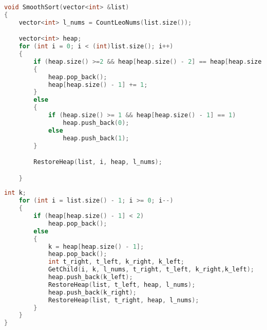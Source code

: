         \begin{lstlisting}[language=C++, label=lst:sort:Smooth_1, caption=Алгоритм плавной сортировки]
void SmoothSort(vector<int> &list)
{
    vector<int> l_nums = CountLeoNums(list.size());

    vector<int> heap;
    for (int i = 0; i < (int)list.size(); i++)
    {
        if (heap.size() >=2 && heap[heap.size() - 2] == heap[heap.size() - 1] + 1)
        {
            heap.pop_back();
            heap[heap.size() - 1] += 1; 
        }
        else
        {
            if (heap.size() >= 1 && heap[heap.size() - 1] == 1)
                heap.push_back(0);
            else
                heap.push_back(1);
        }

        RestoreHeap(list, i, heap, l_nums);

    }
        \end{lstlisting}
        \par \text{      }
        \begin{lstlisting}[language=C++, label=lst:sort:Smooth_2, caption=Алгоритм плавной сортировки]
    int k;
    for (int i = list.size() - 1; i >= 0; i--)
    {
        if (heap[heap.size() - 1] < 2)
            heap.pop_back();
        else
        {
            k = heap[heap.size() - 1];
            heap.pop_back();
            int t_right, t_left, k_right, k_left;
            GetChild(i, k, l_nums, t_right, t_left, k_right,k_left);
            heap.push_back(k_left);
            RestoreHeap(list, t_left, heap, l_nums);
            heap.push_back(k_right);
            RestoreHeap(list, t_right, heap, l_nums);
        }
    }
}
        \end{lstlisting}


